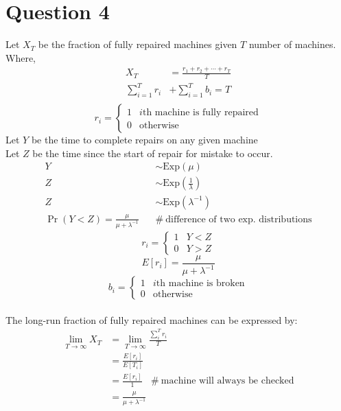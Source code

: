 \documentclass[a4paper, fleqn]{article}
\begin{document}
\section{Question 4}
Let $X_T$ be the fraction of fully repaired machines given $T$ number of machines.\\
Where,
$$\begin{aligned}
X_T&=\frac{r_1+r_2+\cdots+r_T}{T}\\
\sum_{i=1}^T r_i&+\sum_{i=1}^T b_i=T\\
\end{aligned}$$
$$
r_i=\left\{\begin{array}{ll}
1&i\text{th machine is fully repaired}\\0& \text{otherwise}
\end{array}\right.
$$
Let $Y$ be the time to complete repairs on any given machine\\
Let $Z$ be the time since the start of repair for mistake to occur.
$$
\begin{aligned}
Y&\sim\text{Exp}(\mu)\\
Z&\sim\text{Exp}(\frac{1}{\lambda})\\
Z&\sim\text{Exp}(\lambda^{-1})\\
\Pr(Y<Z)=\frac{\mu}{\mu+\lambda^{-1}}\ \ \ \ &\#\ \text{difference of two exp. distributions}
\end{aligned}
$$
$$
r_i=\left\{\begin{array}{ll}
1&Y<Z\\0&Y>Z
\end{array}\right.
$$
$$
E[r_i]=\frac{\mu}{\mu+\lambda^{-1}}
$$
$$
b_i=\left\{\begin{array}{ll}
1&i\text{th machine is broken}\\0& \text{otherwise}
\end{array}\right.
$$
\\
The long-run fraction of fully repaired machines can be expressed by:
$$
\begin{aligned}
\lim_{T\rightarrow\infty}X_T&=\lim_{T\rightarrow\infty}\frac{\sum_i^T r_i}{T}\\
&=\frac{E[r_i]}{E[T_i]}\\
&=\frac{E[r_i]}{1}\ \ \ \ \#\ \text{machine will always be checked}\\
&=\frac{\mu}{\mu+\lambda^{-1}}
\end{aligned}
$$
\end{document}
